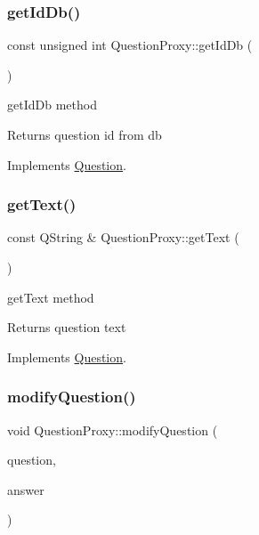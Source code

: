 \subsubsection{\texorpdfstring{get\+Id\+Db()}{getIdDb()}}
{\footnotesize\ttfamily const unsigned int Question\+Proxy\+::get\+Id\+Db (\begin{DoxyParamCaption}{ }\end{DoxyParamCaption})\hspace{0.3cm}{\ttfamily [virtual]}}



get\+Id\+Db method 

\begin{DoxyReturn}{Returns}
question id from db 
\end{DoxyReturn}


Implements \hyperlink{class_question_a5253480b740d35dfb7fe1331d74457b3}{Question}.

\mbox{\label{class_question_proxy_ac5fc3eeef47b1955b116599cb860aa4e}} 
\subsubsection{\texorpdfstring{get\+Text()}{getText()}}
{\footnotesize\ttfamily const Q\+String \& Question\+Proxy\+::get\+Text (\begin{DoxyParamCaption}{ }\end{DoxyParamCaption})\hspace{0.3cm}{\ttfamily [virtual]}}



get\+Text method 

\begin{DoxyReturn}{Returns}
question text 
\end{DoxyReturn}


Implements \hyperlink{class_question_a23e84af04f16e0dee933844d5c46b370}{Question}.

\mbox{\label{class_question_proxy_a420fb6fae2d691aa0c574939b815a205}} 
\subsubsection{\texorpdfstring{modify\+Question()}{modifyQuestion()}}
{\footnotesize\ttfamily void Question\+Proxy\+::modify\+Question (\begin{DoxyParamCaption}\item[{const Q\+String \&}]{question,  }\item[{const Q\+String \&}]{answer }\end{DoxyParamCaption})\hspace{0.3cm}{\ttfamily [virtual]}}



